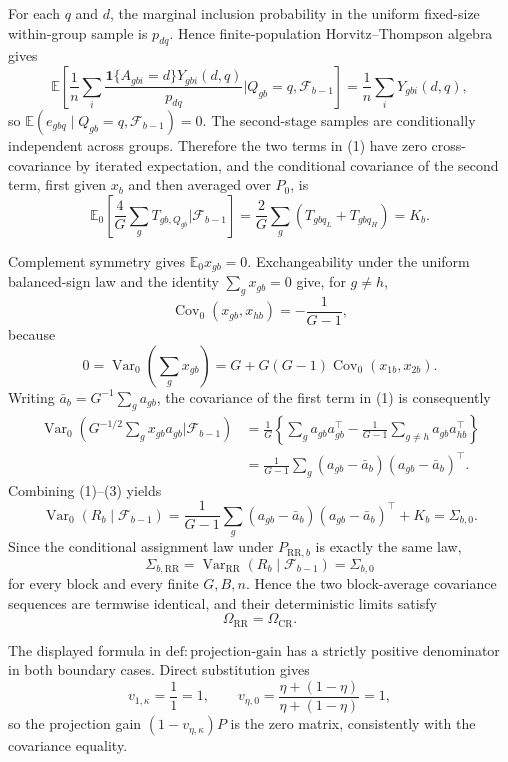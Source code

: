 For each \(q\) and \(d\), the marginal inclusion probability in the uniform fixed-size within-group sample is \(p_{dq}\).  Hence finite-population Horvitz--Thompson algebra gives
\[
 \mathbb E\!\left[
  \frac1n\sum_i\frac{\mathbf1\{A_{gbi}=d\}Y_{gbi}(d,q)}{p_{dq}}
  \mathrel{\Big|}Q_{gb}=q,\mathcal F_{b-1}\right]
 =\frac1n\sum_iY_{gbi}(d,q),
\]
so \(\mathbb E(e_{gbq}\mid Q_{gb}=q,\mathcal F_{b-1})=0\).  The second-stage samples are conditionally independent across groups.  Therefore the two terms in (1) have zero cross-covariance by iterated expectation, and the conditional covariance of the second term, first given \(x_b\) and then averaged over \(P_0\), is
\[
 \mathbb E_0\!\left[
  \frac4G\sum_gT_{gb,Q_{gb}}\mathrel{\Big|}\mathcal F_{b-1}\right]
 =\frac2G\sum_g(T_{gbq_L}+T_{gbq_H})=K_b.
\tag{2}
\]

Complement symmetry gives \(\mathbb E_0x_{gb}=0\).  Exchangeability under the uniform balanced-sign law and the identity \(\sum_gx_{gb}=0\) give, for \(g\neq h\),
\[
 \operatorname{Cov}_0(x_{gb},x_{hb})=-\frac1{G-1},
\]
because
\[
 0=\operatorname{Var}_0\!\left(\sum_gx_{gb}\right)
 =G+G(G-1)\operatorname{Cov}_0(x_{1b},x_{2b}).
\]
Writing \(\bar a_b=G^{-1}\sum_ga_{gb}\), the covariance of the first term in (1) is consequently
\[
 \begin{aligned}
 \operatorname{Var}_0\!\left(G^{-1/2}\sum_gx_{gb}a_{gb}
 \mathrel{\Big|}\mathcal F_{b-1}\right)
 &=\frac1G\left\{\sum_ga_{gb}a_{gb}^{\top}
 -\frac1{G-1}\sum_{g\neq h}a_{gb}a_{hb}^{\top}\right\}\\
 &=\frac1{G-1}\sum_g(a_{gb}-\bar a_b)(a_{gb}-\bar a_b)^{\top}.
 \end{aligned}
\tag{3}
\]
Combining (1)--(3) yields
\[
 \operatorname{Var}_0(R_b\mid\mathcal F_{b-1})
 =\frac1{G-1}\sum_g(a_{gb}-\bar a_b)(a_{gb}-\bar a_b)^{\top}+K_b
 =\Sigma_{b,0}.
\]
Since the conditional assignment law under \(P_{\mathrm{RR},b}\) is exactly the same law,
\[
 \Sigma_{b,\mathrm{RR}}
 =\operatorname{Var}_{\mathrm{RR}}(R_b\mid\mathcal F_{b-1})
 =\Sigma_{b,0}
\]
for every block and every finite \(G,B,n\).  Hence the two block-average covariance sequences are termwise identical, and their deterministic limits satisfy
\[
 \Omega_{\mathrm{RR}}=\Omega_{\mathrm{CR}}.
\]

The displayed formula in \(\mathrm{def:projection\mbox{-}gain}\) has a strictly positive denominator in both boundary cases.  Direct substitution gives
\[
 v_{1,\kappa}=\frac{1}{1}=1,
 \qquad
 v_{\eta,0}
 =\frac{\eta+(1-\eta)}{\eta+(1-\eta)}=1,
\]
so the projection gain \((1-v_{\eta,\kappa})P\) is the zero matrix, consistently with the covariance equality.

